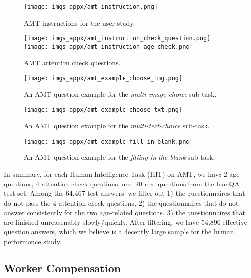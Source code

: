 \documentclass{article}
\begin{document}
\begin{figure*}[t!]
\centering 
    \texttt{[image: imgs\_appx/amt\_instruction.png]}
    \caption{AMT instructions for the user study.}
    \label{fig:amt_instruction}
\end{figure*}

\begin{figure*}[t!]
\centering 
    \texttt{[image: imgs\_appx/amt\_instruction\_check\_question.png]}
    \texttt{[image: imgs\_appx/amt\_instruction\_age\_check.png]}
    \caption{AMT attention check questions.}
    \label{fig:amt_check_ques}
\end{figure*}


\begin{figure*}[t!]
\centering 
\texttt{[image: imgs\_appx/amt\_example\_choose\_img.png]}
    \caption{An AMT question example for the \textit{multi-image-choice} sub-task.}
    \label{fig:amt_example_choose_img}
\end{figure*}

\begin{figure*}[t!]
\centering 
    \texttt{[image: imgs\_appx/amt\_example\_choose\_txt.png]}
    \caption{An AMT question example for the \textit{multi-text-choice} sub-task.}
    \label{fig:amt_example_choose_txt}
\end{figure*}

\begin{figure*}[t!]
\centering 
    \texttt{[image: imgs\_appx/amt\_example\_fill\_in\_blank.png]}
    \caption{An AMT question  example for the \textit{filling-in-the-blank} sub-task.}
    \label{fig:amt_example_fill_in_blank}
\end{figure*}



In summary, for each Human Intelligence Task (HIT) on AMT, we have 2 age questions, 4 attention check questions, and 20 real questions from the IconQA test set. Among the 64,467 test answers, we filter out 1) the questionnaires that do not pass the 4 attention check questions, 2) the questionnaires that do not answer consistently for the two age-related questions, 3) the questionnaires that are finished unreasonably slowly/quickly. After filtering, we have 54,896 effective question answers, which we believe is a decently large sample for the human performance study.\par

\subsection{Worker Compensation}
\label{app:compensation}
\end{document}
